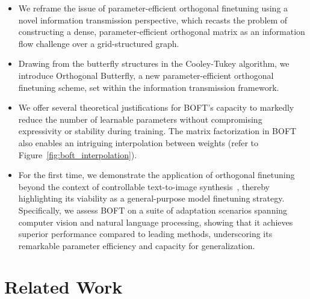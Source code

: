 \begin{itemize}[leftmargin=*,nosep]
    \item We reframe the issue of parameter-efficient orthogonal finetuning using a novel information transmission perspective, which recasts the problem of constructing a dense, parameter-efficient orthogonal matrix as an information flow challenge over a grid-structured graph.
    \item Drawing from the butterfly structures in the Cooley-Tukey algorithm, we introduce Orthogonal Butterfly, a new parameter-efficient orthogonal finetuning scheme, set within the information transmission framework.
    \item We offer several theoretical justifications for BOFT's capacity to markedly reduce the number of learnable parameters without compromising expressivity or stability during training. The matrix factorization in BOFT also enables an intriguing interpolation between weights (refer to Figure~\ref{fig:boft_interpolation}).
    \item For the first time, we demonstrate the application of orthogonal finetuning beyond the context of controllable text-to-image synthesis~\cite{qiu2023controlling}, thereby highlighting its viability as a general-purpose model finetuning strategy. Specifically, we assess BOFT on a suite of adaptation scenarios spanning computer vision and natural language processing, showing that it achieves superior performance compared to leading methods, underscoring its remarkable parameter efficiency and capacity for generalization.
\end{itemize}

\section{Related Work}

